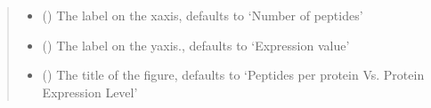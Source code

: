 \documentclass[letterpaper,10pt,english]{sphinxmanual}
\begin{document}
\begin{fulllineitems}
\begin{quote}
\begin{description}
\begin{itemize}
\item {} 
 (\sphinxstyleliteralemphasis{\sphinxupquote{, }}) \textendash{} The label on the x\sphinxhyphen{}axis, defaults to ‘Number of peptides’

\item {} 
 (\sphinxstyleliteralemphasis{\sphinxupquote{, }}) \textendash{} The label on the y\sphinxhyphen{}axis., defaults to ‘Expression value’

\item {} 
 (\sphinxstyleliteralemphasis{\sphinxupquote{, }}) \textendash{} The title of the figure, defaults to ‘Peptides per protein Vs. Protein Expression Level’

\end{itemize}

\end{description}\end{quote}

\end{fulllineitems}

\end{document}
